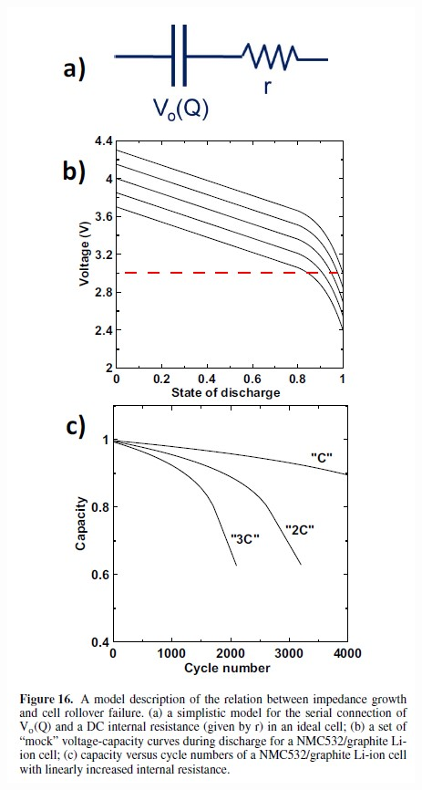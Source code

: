 \documentclass{article}
\begin{document}
\hfil\includegraphics[scale=0.5]{images/Ma_JES_2019_Fig16.jpg}
\end{document}
